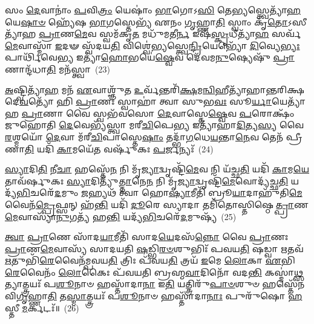 𑌸𑌂 \ul{𑌦𑍇}\-𑌵𑌾𑌨𑌾𑌂॑ \ul{𑌪}\-𑌵𑌿\-\ul{𑌤𑍍𑌰𑌂} 𑌯𑍇𑌷𑌾𑌂॑ \ul{𑌭𑌾}\-𑌗𑍋\-𑌽\-\ul{𑌸𑌿} 𑌤𑍇\-\ul{𑌭𑍍𑌯}\-𑌸𑍍𑌤𑍍𑌵𑍇𑌤𑍍𑌯𑌾᳴\-\ul{𑌹} 𑌯𑍇\-\ul{𑌷𑌾}\-\-\ul{𑍞} 𑌹𑍍𑌯𑍇᳴𑌷 \ul{𑌭𑌾}\-𑌗𑌸𑍍𑌤𑍇𑌭𑍍𑌯᳴ 𑌏𑌨𑌂 \ul{𑌗𑍃}\-𑌹𑍍𑌣𑌾\-\ul{𑌤𑌿} 𑌸𑍍𑌵𑌾𑌂 𑌕𑍃᳴\-\ul{𑌤𑍋}\-\-𑌽𑌸𑍀𑌤𑍍𑌯𑌾᳴𑌹 \ul{𑌪𑍍𑌰𑌾}\-𑌣\-\ul{𑌮𑍇}\-𑌵 𑌸𑍍𑌵𑌮᳴𑌕𑍃\-\ul{𑌤} 𑌮𑌧𑍁᳴𑌮𑌤𑍀\-\ul{𑌰𑍍𑌨} 𑌇𑌷᳴\-\ul{𑌸𑍍𑌕𑍃}\-𑌧𑍀𑌤𑍍𑌯𑌾᳴\-\ul{𑌹} 𑌸𑌰𑍍𑌵᳴\-\ul{𑌮𑍇}\-𑌵𑌾𑌸𑍍𑌮𑌾᳴ \ul{𑌇}\-𑌦𑍟 𑌸𑍍𑌵᳴𑌦𑌯\-\ul{𑌤𑌿} 𑌵𑌿𑌶𑍍𑌵𑍇॑𑌭𑍍𑌯𑌸𑍍𑌤𑍍𑌵𑍇\-\ul{𑌨𑍍𑌦𑍍𑌰𑌿}\-𑌯𑍇𑌭𑍍𑌯𑍋᳴ \ul{𑌦𑌿}\-𑌵𑍍𑌯𑍇\-\ul{𑌭𑍍𑌯𑌃} 𑌪𑌾𑌰𑍍𑌥𑌿᳴𑌵𑍇\-\ul{𑌭𑍍𑌯} 𑌇𑌤𑍍𑌯𑌾᳴\-\ul{𑌹𑍋}\-𑌭𑌯𑍇॑\-\ul{𑌷𑍍𑌵𑍇}\-𑌵 𑌦𑍇᳴𑌵𑌮\-\ul{𑌨𑍁}\-𑌷𑍍𑌯𑍇𑌷𑍁᳴ \ul{𑌪𑍍𑌰𑌾}\-𑌣𑌾𑌨𑍍𑌦᳴𑌧𑌾\-\ul{𑌤𑌿} 𑌮𑌨᳴𑌸𑍍𑌤𑍍𑌵𑌾~(23)

\-\ul{𑌅}\-𑌷𑍍𑌟𑍍𑌵𑌿𑌤𑍍𑌯𑌾᳴\-\ul{𑌹} 𑌮𑌨᳴ \ul{𑌏}\-𑌵𑌾𑌶𑍍𑌞𑍁᳴𑌤 \ul{𑌉}\-𑌰𑍍𑌵᳴𑌨𑍍𑌤𑌰𑌿᳴\-\ul{𑌕𑍍𑌷}\-𑌮\-\ul{𑌨𑍍𑌵𑌿}\-𑌹𑍀𑌤𑍍𑌯𑌾᳴𑌹𑌾𑌨𑍍𑌤𑌰𑌿𑌕𑍍𑌷𑌦𑍇\-\ul{𑌵}\-𑌤𑍍𑌯𑍋᳴ 𑌹𑌿 \ul{𑌪𑍍𑌰𑌾}\-𑌣𑌃 𑌸𑍍𑌵𑌾𑌹𑌾॑ 𑌤𑍍𑌵𑌾 𑌸𑍁𑌭\-\ul{𑌵𑌃} 𑌸𑍂\-\ul{𑌰𑍍𑌯𑌾}\-𑌯𑍇𑌤𑍍𑌯𑌾᳴𑌹 \ul{𑌪𑍍𑌰𑌾}\-𑌣𑌾 𑌵𑍈 𑌸𑍍𑌵𑌭᳴𑌵𑌸𑍋 \ul{𑌦𑍇}\-𑌵𑌾𑌸𑍍𑌤𑍇\-\ul{𑌷𑍍𑌵𑍇}\-𑌵 \ul{𑌪}\-𑌰𑍋𑌕𑍍𑌷𑌂᳴ 𑌜𑍁𑌹𑍋𑌤𑌿 \ul{𑌦𑍇}\-𑌵𑍇𑌭𑍍𑌯᳴𑌸𑍍𑌤𑍍𑌵𑌾 𑌮𑌰𑍀\-\ul{𑌚𑌿}\-𑌪𑍇\-\ul{𑌭𑍍𑌯} 𑌇𑌤𑍍𑌯𑌾᳴𑌹𑌾\-\ul{𑌦𑌿}\-𑌤𑍍𑌯\-\ul{𑌸𑍍𑌯} 𑌵𑍈 \ul{𑌰}\-𑌶𑍍𑌮𑌯𑍋᳴ \ul{𑌦𑍇}\-𑌵𑌾 𑌮᳴𑌰𑍀\-\ul{𑌚𑌿}\-𑌪𑌾𑌸𑍍𑌤𑍇\-\ul{𑌷𑌾𑌂} 𑌤𑌦𑍍𑌭𑌾᳴\-\ul{𑌗}\-𑌧𑍇\-\ul{𑌯}\-𑌨𑍍𑌤𑌾\-\ul{𑌨𑍇}\-𑌵 𑌤𑍇𑌨᳴ 𑌪𑍍𑌰𑍀𑌣𑌾\-\ul{𑌤𑌿} 𑌯𑌦𑌿᳴ \ul{𑌕𑌾}\-𑌮𑌯𑍇᳴\-\ul{𑌤} 𑌵𑌰𑍍\mbox{}𑌷𑍁᳴𑌕𑌃 \ul{𑌪}\-𑌰𑍍𑌜𑌨𑍍𑌯𑌃᳴~(24)

\-\ul{𑌸𑍍𑌯𑌾}\-𑌦𑌿\-\ul{𑌤𑌿} 𑌨𑍀\-\ul{𑌚𑌾} 𑌹𑌸𑍍𑌤𑍇᳴\-\ul{𑌨} 𑌨𑌿 𑌮𑍃᳴\-\ul{𑌜𑍍𑌯𑌾}\-𑌦𑍍𑌵𑍃𑌷𑍍𑌟𑌿᳴\-\ul{𑌮𑍇}\-𑌵 𑌨𑌿 𑌯᳴𑌚𑍍𑌛\-\ul{𑌤𑌿} 𑌯𑌦𑌿᳴ \ul{𑌕𑌾}\-𑌮\-\ul{𑌯𑍇}\-𑌤𑌾𑌵᳴𑌰𑍍\mbox{}𑌷𑍁𑌕𑌃 \ul{𑌸𑍍𑌯𑌾}\-𑌦𑌿𑌤𑍍𑌯𑍁᳴\-\ul{𑌤𑍍𑌤𑌾}\-𑌨𑍇\-\ul{𑌨} 𑌨𑌿 𑌮𑍃᳴\-\ul{𑌜𑍍𑌯𑌾}\-𑌦𑍍𑌵𑍃𑌷𑍍𑌟𑌿᳴\-\ul{𑌮𑍇}\-𑌵𑍋𑌦𑍍𑌯᳴𑌚𑍍𑌛\-\ul{𑌤𑌿} 𑌯𑌦𑍍𑌯᳴\-\ul{𑌭𑌿}\-𑌚𑌰𑍇᳴\-\ul{𑌦}\-𑌮𑍁𑌂 \ul{𑌜}\-𑌹𑍍𑌯𑌥᳴ 𑌤𑍍𑌵𑌾 𑌹𑍋\-\ul{𑌷𑍍𑌯𑌾}\-𑌮𑍀𑌤𑌿᳴ 𑌬𑍍𑌰𑍂\-\ul{𑌯𑌾}\-𑌦𑌾𑌹𑍁᳴𑌤𑌿\-\ul{𑌮𑍇}\-𑌵𑍈𑌨᳴\-\ul{𑌮𑍍𑌪𑍍𑌰𑍇}\-𑌫𑍍𑌸𑌨𑍍 𑌹᳴\-\ul{𑌨𑍍𑌤𑌿} 𑌯𑌦𑌿᳴ \ul{𑌦𑍂}\-𑌰𑍇 𑌸𑍍𑌯𑌾𑌦𑌾 𑌤𑌮𑌿᳴𑌤𑍋𑌸𑍍𑌤𑌿𑌷𑍍𑌠𑍇\-\ul{𑌤𑍍𑌪𑍍𑌰𑌾}\-𑌣\-\ul{𑌮𑍇}\-𑌵𑌾𑌸𑍍𑌯𑌾᳴\-\ul{𑌨𑍁}\-𑌗𑌤𑍍𑌯᳴ 𑌹\-\ul{𑌨𑍍𑌤𑌿} 𑌯𑌦𑍍𑌯᳴\-\ul{𑌭𑌿}\-𑌚𑌰𑍇᳴\-\ul{𑌦}\-𑌮𑍁𑌷𑍍𑌯᳴~(25)

\-\ul{𑌤𑍍𑌵𑌾} \ul{𑌪𑍍𑌰𑌾}\-𑌣𑍇 𑌸𑌾᳴𑌦\-\ul{𑌯𑌾}\-𑌮𑍀𑌤𑌿᳴ 𑌸𑌾𑌦\-\ul{𑌯𑍇}\-𑌦𑌸᳴\-\ul{𑌨𑍍𑌨𑍋} 𑌵𑍈 \ul{𑌪𑍍𑌰𑌾}\-𑌣𑌃 \ul{𑌪𑍍𑌰𑌾}\-𑌣\-\ul{𑌮𑍇}\-𑌵𑌾𑌸𑍍𑌯᳴ 𑌸𑌾𑌦𑌯𑌤𑌿 \ul{𑌷}\-𑌡𑍍𑌭𑌿\-\ul{𑌰}\-\-\ul{𑍞}\-𑌶𑍁𑌭𑌿𑌃᳴ 𑌪𑌵𑌯\-\ul{𑌤𑌿} 𑌷𑌡𑍍𑌵𑌾 \ul{𑌋}\-𑌤𑌵᳴ \ul{𑌋}\-𑌤𑍁𑌭𑌿᳴\-\ul{𑌰𑍇}\-𑌵𑍈𑌨᳴𑌮𑍍𑌪𑌵𑌯\-\ul{𑌤𑌿} 𑌤𑍍𑌰𑌿𑌃 𑌪᳴𑌵𑌯\-\ul{𑌤𑌿} 𑌤𑍍𑌰𑌯᳴ \ul{𑌇}\-𑌮𑍇 \ul{𑌲𑍋}\-𑌕𑌾 \ul{𑌏}\-𑌭𑌿\-\ul{𑌰𑍇}\-𑌵𑍈𑌨𑌂᳴ \ul{𑌲𑍋}\-𑌕𑍈𑌃 𑌪᳴𑌵𑌯𑌤𑌿 𑌬𑍍𑌰𑌹𑍍𑌮\-\ul{𑌵𑌾}\-𑌦𑌿𑌨𑍋᳴ 𑌵𑌦\-\ul{𑌨𑍍𑌤𑌿} 𑌕𑌸𑍍𑌮𑌾॑\-\ul{𑌥𑍍𑌸}\-𑌤𑍍𑌯𑌾𑌤𑍍𑌤𑍍𑌰𑌯𑌃᳴ 𑌪\-\ul{𑌶𑍂}\-𑌨𑌾𑍞 𑌹𑌸𑍍𑌤𑌾᳴𑌦𑌾\-\ul{𑌨𑌾} 𑌇\-\ul{𑌤𑌿} 𑌯𑌤𑍍𑌤𑍍𑌰𑌿𑌰𑍁᳴\-\ul{𑌪𑌾}\-\-\ul{𑍞}\-𑌶𑍁𑍞 𑌹𑌸𑍍𑌤𑍇᳴𑌨 𑌵𑌿\-\ul{𑌗𑍃}\-𑌹𑍍𑌣𑌾\-\ul{𑌤𑌿} 𑌤\-\ul{𑌸𑍍𑌮𑌾}\-𑌤𑍍𑌤𑍍𑌰𑌯𑌃᳴ 𑌪\-\ul{𑌶𑍂}\-𑌨𑌾𑍞 𑌹𑌸𑍍𑌤𑌾᳴𑌦𑌾\-\ul{𑌨𑌾𑌃} 𑌪𑍁𑌰𑍁᳴𑌷𑍋 \ul{𑌹}\-𑌸𑍍𑌤𑍀 \ul{𑌮}\-𑌰𑍍𑌕𑌟𑌃᳴॥~(26)

{\anuvakamend[{𑌮𑌾𑌧𑍍𑌯᳴𑌨𑍍𑌦𑌿𑌨\-\ul{𑌮}\-𑌷𑍍𑌟𑌾𑌵᳴𑌷𑍍𑌟𑌾\-\ul{𑌵𑍇}\-𑌷 𑌮𑌨᳴𑌸𑍍𑌤𑍍𑌵𑌾 \ul{𑌪}\-𑌰𑍍𑌜\-\ul{𑌨𑍍𑌯𑍋}\-\-𑌽𑌮𑍁\-\ul{𑌷𑍍𑌯} 𑌪𑍁𑌰𑍁᳴\-\ul{𑌷𑍋} 𑌦𑍍𑌵𑍇 𑌚᳴}]}%

